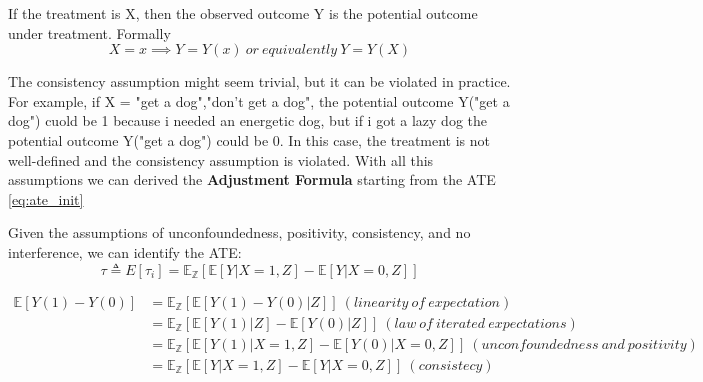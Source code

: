 \begin{definition}[Consistency]
    If the treatment is X, then the observed outcome Y is
    the potential outcome under treatment. Formally
    \begin{equation}
    X = x \implies Y = Y(x)\ or\ equivalently\ Y = Y(X)
    \end{equation}
\end{definition}
The consistency assumption might seem trivial, but it can be violated in practice. For example,
if X = {"get a dog","don't get a dog"}, the potential outcome Y("get a dog") cuold be 1 because i needed
an energetic dog, but if i got a lazy dog the potential outcome Y("get a dog") could be 0.
In this case, the treatment is not well-defined and the consistency assumption is violated.
\newline
With all this assumptions we can derived the \textbf{Adjustment Formula} starting from the
ATE \ref{eq:ate_init}

\begin{definition}
    Given the assumptions of unconfoundedness, positivity, consistency,
    and no interference, we can identify the ATE:
    \begin{equation}
        \tau \triangleq E[\tau_i] = \mathbb{E_Z}[\mathbb{E}[Y \vert{} X = 1,Z] - \mathbb{E}[Y \vert{} X = 0,Z]]
    \end{equation}
\end{definition}
\begin{dimostration}
    \begin{align*}
        \mathbb{E}[Y(1) - Y(0)] &= \mathbb{E_Z}[\mathbb{E}[Y(1) - Y(0) \vert{} Z]]\ (linearity\ of\ expectation)\\
        &= \mathbb{E_Z}[\mathbb{E}[Y(1) \vert{} Z] - \mathbb{E}[Y(0) \vert{} Z]]\ (law\ of\ iterated\ expectations)\\
        &= \mathbb{E_Z}[\mathbb{E}[Y(1) \vert{} X = 1, Z] - \mathbb{E}[Y(0) \vert{} X = 0, Z]]\ (unconfoundedness\ and\ positivity)\\
        &= \mathbb{E_Z}[\mathbb{E}[Y \vert{} X = 1, Z] - \mathbb{E}[Y \vert{} X = 0, Z]]\ (consistecy)
    \end{align*}
\end{dimostration}

